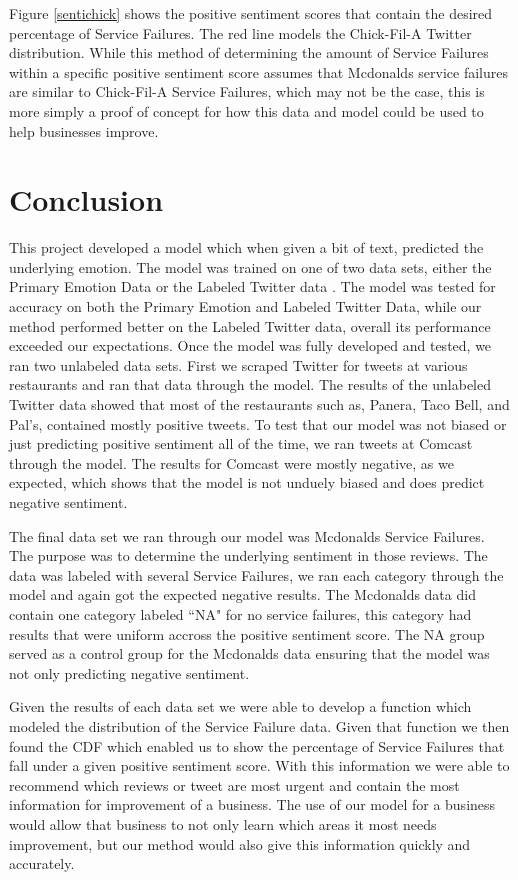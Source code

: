 \documentclass[titlepage,letterpaper]{article}
\begin{document}
Figure \ref{sentichick} shows the positive sentiment scores that contain the desired percentage of Service Failures. The red line models the Chick-Fil-A Twitter distribution. While this method of determining the amount of Service Failures within a specific positive sentiment score assumes that Mcdonalds service failures are similar to Chick-Fil-A Service Failures, which may not be the case, this is more simply a proof of concept for how this data and model could be used to help businesses improve.  

\section{Conclusion}
This project developed a model which when given a bit of text, predicted the underlying emotion. The model was trained on one of two data sets, either the Primary Emotion Data \cite{lowriwilliams} or the Labeled Twitter data \cite{LabeledTwitter}. The model was tested for accuracy on both the Primary Emotion and Labeled Twitter Data, while our method performed better on the Labeled Twitter data, overall its performance exceeded our expectations. Once the model was fully developed and tested, we ran two unlabeled data sets. First we scraped Twitter for tweets at various restaurants and ran that data through the model. The results of the unlabeled Twitter data showed that most of the restaurants such as, Panera, Taco Bell, and Pal's, contained mostly positive tweets. To test that our model was not biased or just predicting positive sentiment all of the time, we ran tweets at Comcast through the model. The results for Comcast were mostly negative, as we expected, which shows that the model is not unduely biased and does predict negative sentiment. 

The final data set we ran through our model was Mcdonalds Service Failures. The purpose was to determine the underlying sentiment in those reviews. The data was labeled with several Service Failures, we ran each category through the model and again got the expected negative results. The Mcdonalds data did contain one category labeled ``NA" for no service failures, this category had results that were uniform accross the positive sentiment score. The NA group served as a control group for the Mcdonalds data ensuring that the model was not only predicting negative sentiment. 

Given the results of each data set we were able to develop a function which modeled the distribution of the Service Failure data. Given that function we then found the CDF which enabled us to show the percentage of Service Failures that fall under a given positive sentiment score. With this information we were able to recommend which reviews or tweet are most urgent and contain the most information for improvement of a business. The use of our model for a business would allow that business to not only learn which areas it most needs improvement, but our method would also give this information quickly and accurately.
\end{document}
